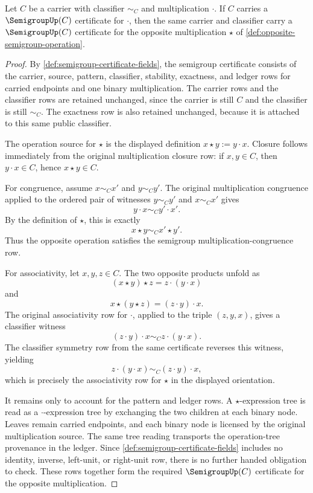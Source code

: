 \begin{proposition}
\label{prop:opposite-semigroup-certificate}
Let $C$ be a carrier with classifier $\sim_C$ and multiplication $\cdot$. If $C$ carries a $\SemigroupUp(C)$ certificate for $\cdot$, then the same carrier and classifier carry a $\SemigroupUp(C)$ certificate for the opposite multiplication $\star$ of \autoref{def:opposite-semigroup-operation}.
\end{proposition}
\begin{proof}
By \autoref{def:semigroup-certificate-fields}, the semigroup certificate consists of the carrier, source, pattern, classifier, stability, exactness, and ledger rows for carried endpoints and one binary multiplication. The carrier rows and the classifier rows are retained unchanged, since the carrier is still $C$ and the classifier is still $\sim_C$. The exactness row is also retained unchanged, because it is attached to this same public classifier.

The operation source for $\star$ is the displayed definition $x\star y:=y\cdot x$. Closure follows immediately from the original multiplication closure row: if $x,y\in C$, then $y\cdot x\in C$, hence $x\star y\in C$.

For congruence, assume $x\sim_C x'$ and $y\sim_C y'$. The original multiplication congruence applied to the ordered pair of witnesses $y\sim_C y'$ and $x\sim_C x'$ gives
$$
y\cdot x\sim_C y'\cdot x'.
$$
By the definition of $\star$, this is exactly
$$
x\star y\sim_C x'\star y'.
$$
Thus the opposite operation satisfies the semigroup multiplication-congruence row.

For associativity, let $x,y,z\in C$. The two opposite products unfold as
$$
(x\star y)\star z=z\cdot (y\cdot x)
$$
and
$$
x\star (y\star z)=(z\cdot y)\cdot x.
$$
The original associativity row for $\cdot$, applied to the triple $(z,y,x)$, gives a classifier witness
$$
(z\cdot y)\cdot x\sim_C z\cdot (y\cdot x).
$$
The classifier symmetry row from the same certificate reverses this witness, yielding
$$
z\cdot (y\cdot x)\sim_C (z\cdot y)\cdot x,
$$
which is precisely the associativity row for $\star$ in the displayed orientation.

It remains only to account for the pattern and ledger rows. A $\star$-expression tree is read as a $\cdot$-expression tree by exchanging the two children at each binary node. Leaves remain carried endpoints, and each binary node is licensed by the original multiplication source. The same tree reading transports the operation-tree provenance in the ledger. Since \autoref{def:semigroup-certificate-fields} includes no identity, inverse, left-unit, or right-unit row, there is no further handed obligation to check. These rows together form the required $\SemigroupUp(C)$ certificate for the opposite multiplication.
\end{proof}

